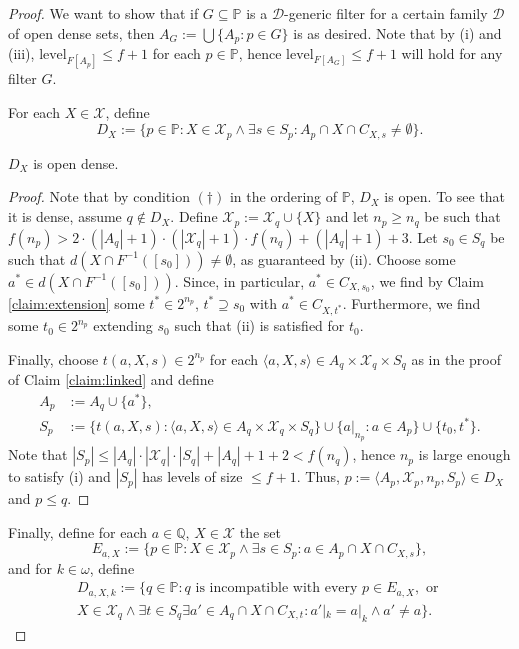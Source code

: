 \documentclass[10pt,a4paper]{amsart}
\newcommand\level{\text{level}}
\begin{document}
\begin{proof}
We want to show that if $G\subseteq \mathbb{P}$ is a $\mathcal{D}$-generic filter for a certain family $\mathcal{D}$ of open dense sets, then $A_G:=\bigcup \{A_p: p \in G\}$ is as desired. Note that by (i) and (iii), $\level_{F[A_p]}\leq f+1$ for each $p \in \mathbb{P}$, hence $\level_{F[A_G]}\leq f+1$ will hold for any filter $G$.

For each $X \in \mathcal{X}$, define
\[D_X:=\{p \in \mathbb{P}: X \in \mathcal{X}_p \land \exists s \in S_p: A_p \cap X \cap C_{X,s}\neq \emptyset\}.\]

\begin{claim}\label{claim:DX}
$D_X$ is open dense.	
\end{claim}

\begin{proof}
Note that by condition $(\dagger)$ in the ordering of $\mathbb{P}$, $D_X$ is open. To see that it is dense, assume $q \notin D_X$. Define $\mathcal{X}_p:=\mathcal{X}_q \cup \{X\}$ and let $n_p \geq n_q$ be such that $f(n_p)> 2 \cdot (|A_q|+1)\cdot (|\mathcal{X}_q|+1) \cdot f(n_q)+(|A_q|+1)+3$. Let $s_0 \in S_q$ be such that $d(X \cap F^{-1}([s_0]))\neq \emptyset$, as guaranteed by (ii). Choose some $a^{\ast} \in d(X \cap F^{-1}([s_0]))$. Since, in particular, $a^{\ast} \in C_{X,s_0}$, we find by Claim \ref{claim:extension} some $t^{\ast} \in 2^{n_p}$, $t^{\ast} \supseteq s_0$ with $a^{\ast} \in C_{X,t^{\ast}}$. Furthermore, we find some $t_0 \in 2^{n_p}$ extending $s_0$ such that (ii) is satisfied for $t_0$.

Finally, choose $t(a,X,s)\in 2^{n_p}$ for each $\langle a, X, s\rangle \in A_q \times \mathcal{X}_q \times S_q$ as in the proof of Claim \ref{claim:linked} and define
\[\begin{aligned}
	A_p&:=A_q \cup \{a^{\ast}\},\\
	S_p&:=\{t(a,X,s): \langle a, X, s\rangle \in A_q \times \mathcal{X}_q \times S_q\} \cup \{a|_{n_p}: a \in A_p\} \cup \{t_0, t^{\ast}\}.
\end{aligned}\]
Note that $|S_p|\leq |A_q|\cdot |\mathcal{X}_q|\cdot |S_q|+ |A_q|+1 +2 < f(n_q)$, hence $n_p$ is large enough to satisfy (i) and $|S_p|$ has levels of size $\leq f+1$. Thus, $p:=\langle A_p, \mathcal{X}_p, n_p, S_p \rangle \in D_X$ and $p \leq q$.
\end{proof}

Finally, define for each $a \in \mathbb{Q}$, $X \in \mathcal{X}$ the set
\[E_{a,X}:=\{p \in \mathbb{P}: X \in \mathcal{X}_p \land \exists s \in S_p:  a \in A_p \cap X \cap C_{X,s}\},\]
 and for $k \in \omega$, define
\[\begin{aligned}D_{a, X, k}:=\{q \in \mathbb{P}: q \text{ is incompatible with every } p \in E_{a,X}, \text { or } \\
X \in \mathcal{X}_q \land \exists t \in S_q \exists a' \in A_q \cap X \cap C_{X,t}: a'|_k = a|_k \land a' \neq a\}.
\end{aligned}\]


\end{proof}
\end{document}
